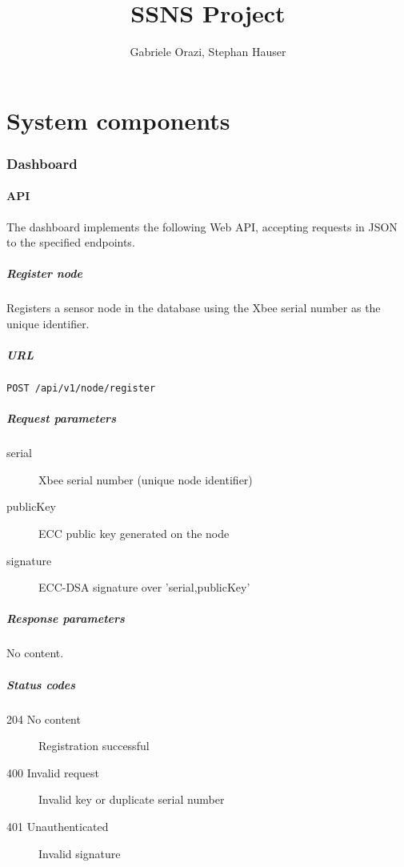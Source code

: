 \documentclass[]{scrreprt}
\title{SSNS Project}
\author{Gabriele Orazi, Stephan Hauser}
\begin{document}
\maketitle

\part{System components}
\section{Dashboard}
\subsection{API}
The dashboard implements the following Web API, accepting requests in JSON to the specified endpoints.

\subsubsection{Register node}
Registers a sensor node in the database using the Xbee serial number as the unique identifier.

\subsubsection*{URL}
\texttt{POST /api/v1/node/register}

\subsubsection*{Request parameters}
\begin{description}
\item[serial] Xbee serial number (unique node identifier)
\item[publicKey] ECC public key generated on the node
\item[signature] ECC-DSA signature over 'serial,publicKey'
\end{description}

\subsubsection*{Response parameters}
No content.

\subsubsection*{Status codes}
\begin{description}
\item[204 No content] Registration successful
\item[400 Invalid request] Invalid key or duplicate serial number
\item[401 Unauthenticated] Invalid signature
\end{description}
\end{document}
